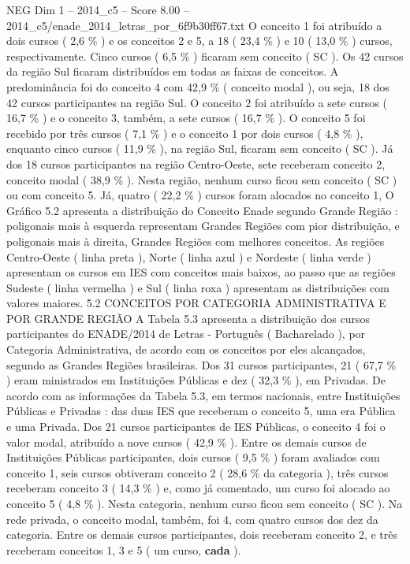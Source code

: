 \begin{textsample}{NEG Dim 1 – 2014\_c5 – Score 8.00 – 2014\_c5/enade\_2014\_letras\_por\_6f9b30ff67.txt}
O conceito 1 foi atribuído a dois cursos ( 2,6 \% ) e os conceitos 2 e 5, a 18 ( 23,4 \% ) e 10 ( 13,0 \% ) cursos, respectivamente.
Cinco cursos ( 6,5 \% ) ficaram sem conceito ( SC ).
Os 42 cursos da região Sul ficaram distribuídos em todas as faixas de conceitos.
A predominância foi do conceito 4 com 42,9 \% ( conceito modal ), ou seja, 18 dos 42 cursos participantes na região Sul.
O conceito 2 foi atribuído a sete cursos ( 16,7 \% ) e o conceito 3, também, a sete cursos ( 16,7 \% ).
O conceito 5 foi recebido por três cursos ( 7,1 \% ) e o conceito 1 por dois cursos ( 4,8 \% ), enquanto cinco cursos ( 11,9 \% ), na região Sul, ficaram sem conceito ( SC ).
Já dos 18 cursos participantes na região Centro-Oeste, sete receberam conceito 2, conceito modal ( 38,9 \% ).
Nesta região, nenhum curso ficou sem conceito ( SC ) ou com conceito 5.
Já, quatro ( 22,2 \% ) cursos foram alocados no conceito 1, O Gráfico 5.2 apresenta a distribuição do Conceito Enade segundo Grande Região : poligonais mais à esquerda representam Grandes Regiões com pior distribuição, e poligonais mais à direita, Grandes Regiões com melhores conceitos.
As regiões Centro-Oeste ( linha preta ), Norte ( linha azul ) e Nordeste ( linha verde ) apresentam os cursos em IES com conceitos mais baixos, ao passo que as regiões Sudeste ( linha vermelha ) e Sul ( linha roxa ) apresentam as distribuições com valores maiores. 5.2 CONCEITOS POR CATEGORIA ADMINISTRATIVA E POR GRANDE REGIÃO A Tabela 5.3 apresenta a distribuição dos cursos participantes do ENADE/2014 de Letras - Português ( Bacharelado ), por Categoria Administrativa, de acordo com os conceitos por eles alcançados, segundo as Grandes Regiões brasileiras.
Dos 31 cursos participantes, 21 ( 67,7 \% ) eram ministrados em Instituições Públicas e dez ( 32,3 \% ), em Privadas.
De acordo com as informações da Tabela 5.3, em termos nacionais, entre Instituições Públicas e Privadas : das duas IES que receberam o conceito 5, uma era Pública e uma Privada.
Dos 21 cursos participantes de IES Públicas, o conceito 4 foi o valor modal, atribuído a nove cursos ( 42,9 \% ).
Entre os demais cursos de Instituições Públicas participantes, dois cursos ( 9,5 \% ) foram avaliados com conceito 1, seis cursos obtiveram conceito 2 ( 28,6 \% da categoria ), três cursos receberam conceito 3 ( 14,3 \% ) e, como já comentado, um curso foi alocado ao conceito 5 ( 4,8 \% ).
Nesta categoria, nenhum curso ficou sem conceito ( SC ).
Na rede privada, o conceito modal, também, foi 4, com quatro cursos dos dez da categoria.
Entre os demais cursos participantes, dois receberam conceito 2, e três receberam conceitos 1, 3 e 5 ( um curso, \textbf{cada} ).

\end{textsample}
